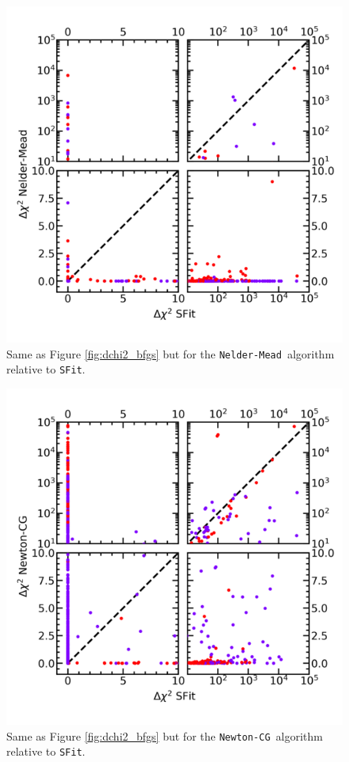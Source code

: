 \documentclass[preprint]{aastex631}
\newcommand{\neldermead}{\texttt{Nelder-Mead}}
\newcommand{\newtoncg}{\texttt{Newton-CG}}
\newcommand{\sfit}{\texttt{SFit}}
\begin{document}
\begin{figure}
	\begin{centering}
	\includegraphics[height=0.5\textheight]{figs/Dchi2_Nelder-Mead.png}
	\caption{Same as Figure \ref{fig:dchi2_bfgs} but for the \neldermead\, algorithm relative to \sfit.
	 \label{fig:dchi2_nm}}
	 \end{centering}
\end{figure}

\begin{figure}
	\begin{centering}
	\includegraphics[height=0.5\textheight]{figs/Dchi2_Newton-CG.png}
	\caption{Same as Figure \ref{fig:dchi2_bfgs} but for the \newtoncg\, algorithm relative to \sfit.}
	 \label{fig:dchi2_newtoncg}
	 \end{centering}
\end{figure}
\end{document}
